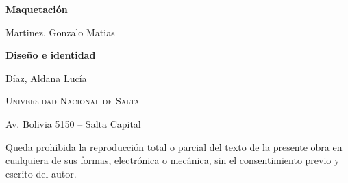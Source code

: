 \vspace*{5mm}

\begin{center}
	\sffamily \Large \bfseries Maquetación
	\vspace*{1mm}
	
	\large \normalfont
	Martinez, Gonzalo Matias
\end{center}

\vspace*{5mm}

\begin{center}
	\sffamily \Large \bfseries Diseño e identidad
	\vspace*{1mm}
	
	\large \normalfont
	Díaz, Aldana Lucía
\end{center}

\vfill

\begin{center}
	\scshape \Large Universidad Nacional de Salta
	
	\normalfont \normalsize
	Av. Bolivia 5150 -- Salta Capital
\end{center}

\vfill

\begin{center}
	\footnotesize
	Queda prohibida la reproducción total o parcial del texto de la presente obra en cualquiera de sus formas, electrónica o mecánica, sin el consentimiento previo y escrito del autor.
\end{center}